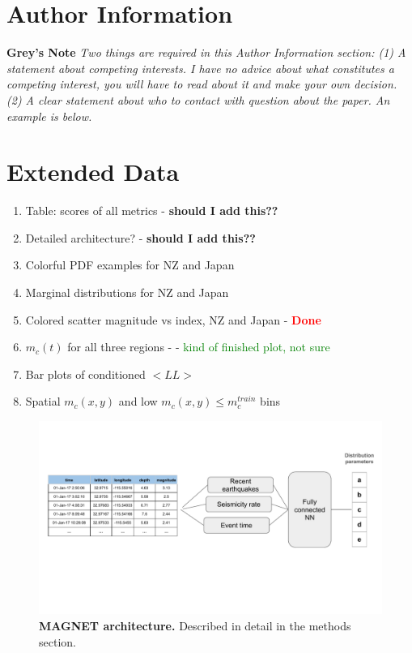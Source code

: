 \documentclass[pdflatex]{sn-jnl}
\begin{document}
\section*{Author Information}
\textbf{Grey's Note} \textit{Two things are required in this Author Information section: (1) A statement about competing interests. I have no advice about what constitutes a competing interest, you will have to read about it and make your own decision. (2) A clear statement about who to contact with question about the paper. An example is below.}


\newpage
\section*{Extended Data}
\begin{enumerate}
    \item Table: scores of all metrics - \textbf{should I add this??}
    \item Detailed architecture? - \textbf{should I add this??}
    \item Colorful PDF examples for NZ and Japan
    \item Marginal distributions for NZ and Japan
    \item Colored scatter magnitude vs index, NZ and Japan - \textcolor{red}{\textbf{Done}}
    \item $m_c(t)$ for all three regions -  - \textcolor{green}{kind of finished plot, not sure}
    \item Bar plots of conditioned $<LL>$
    \item Spatial $m_c(x, y)$ and low $m_c(x, y) \leq m_c^{train}$ bins
\end{enumerate}

\newpage
\begin{figure}
    \centering
    \includegraphics[width=1\textwidth]{figures/detailed_architecture.pdf}
    \caption{\textbf{MAGNET architecture.} Described in detail in the methods section.}
    \label{fig:architecture}
\end{figure}
\end{document}
